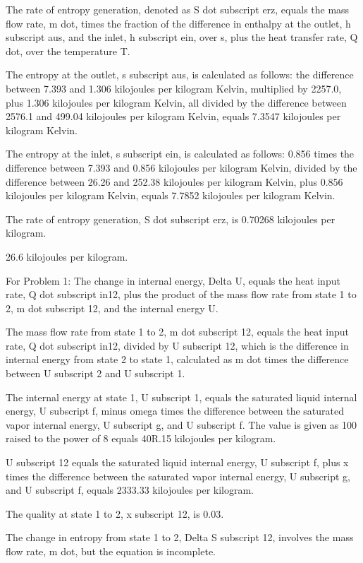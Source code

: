 The rate of entropy generation, denoted as S dot subscript erz, equals the mass flow rate, m dot, times the fraction of the difference in enthalpy at the outlet, h subscript aus, and the inlet, h subscript ein, over s, plus the heat transfer rate, Q dot, over the temperature T.

The entropy at the outlet, s subscript aus, is calculated as follows: the difference between 7.393 and 1.306 kilojoules per kilogram Kelvin, multiplied by 2257.0, plus 1.306 kilojoules per kilogram Kelvin, all divided by the difference between 2576.1 and 499.04 kilojoules per kilogram Kelvin, equals 7.3547 kilojoules per kilogram Kelvin.

The entropy at the inlet, s subscript ein, is calculated as follows: 0.856 times the difference between 7.393 and 0.856 kilojoules per kilogram Kelvin, divided by the difference between 26.26 and 252.38 kilojoules per kilogram Kelvin, plus 0.856 kilojoules per kilogram Kelvin, equals 7.7852 kilojoules per kilogram Kelvin.

The rate of entropy generation, S dot subscript erz, is 0.70268 kilojoules per kilogram.

26.6 kilojoules per kilogram.

For Problem 1:
The change in internal energy, Delta U, equals the heat input rate, Q dot subscript in12, plus the product of the mass flow rate from state 1 to 2, m dot subscript 12, and the internal energy U.

The mass flow rate from state 1 to 2, m dot subscript 12, equals the heat input rate, Q dot subscript in12, divided by U subscript 12, which is the difference in internal energy from state 2 to state 1, calculated as m dot times the difference between U subscript 2 and U subscript 1.

The internal energy at state 1, U subscript 1, equals the saturated liquid internal energy, U subscript f, minus omega times the difference between the saturated vapor internal energy, U subscript g, and U subscript f. The value is given as 100 raised to the power of 8 equals 40R.15 kilojoules per kilogram.

U subscript 12 equals the saturated liquid internal energy, U subscript f, plus x times the difference between the saturated vapor internal energy, U subscript g, and U subscript f, equals 2333.33 kilojoules per kilogram.

The quality at state 1 to 2, x subscript 12, is 0.03.

The change in entropy from state 1 to 2, Delta S subscript 12, involves the mass flow rate, m dot, but the equation is incomplete.